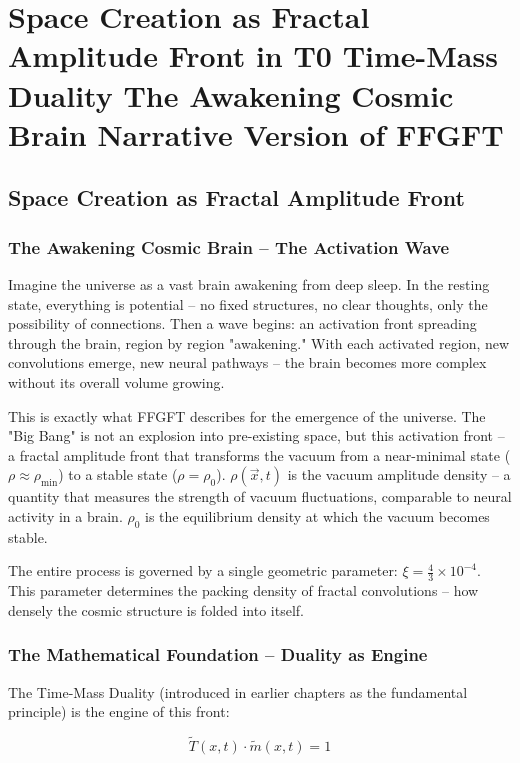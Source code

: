 \chapter{Space Creation as Fractal Amplitude Front  in T0 Time-Mass Duality  The Awakening Cosmic Brain  Narrative Version of FFGFT}


\section{Space Creation as Fractal Amplitude Front}

\subsection*{The Awakening Cosmic Brain -- The Activation Wave}

Imagine the universe as a vast brain awakening from deep sleep. In the resting state, everything is potential -- no fixed structures, no clear thoughts, only the possibility of connections. Then a wave begins: an activation front spreading through the brain, region by region "awakening." With each activated region, new convolutions emerge, new neural pathways -- the brain becomes more complex without its overall volume growing.

This is exactly what FFGFT describes for the emergence of the universe. The "Big Bang" is not an explosion into pre-existing space, but this activation front -- a fractal amplitude front that transforms the vacuum from a near-minimal state ($\rho \approx \rho_{\min}$) to a stable state ($\rho = \rho_0$). $\rho(\vec{x},t)$ is the vacuum amplitude density -- a quantity that measures the strength of vacuum fluctuations, comparable to neural activity in a brain. $\rho_0$ is the equilibrium density at which the vacuum becomes stable.

The entire process is governed by a single geometric parameter: $\xi = \frac{4}{3} \times 10^{-4}$. This parameter determines the packing density of fractal convolutions -- how densely the cosmic structure is folded into itself.

\subsection*{The Mathematical Foundation -- Duality as Engine}

The Time-Mass Duality (introduced in earlier chapters as the fundamental principle) is the engine of this front:

\begin{equation}
\tilde{T}(x,t) \cdot \tilde{m}(x,t) = 1
\end{equation}

